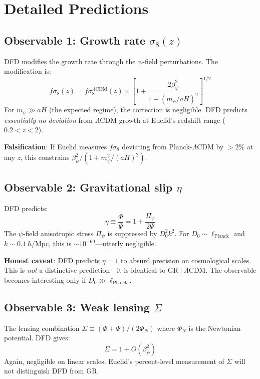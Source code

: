 \documentclass[11pt,a4paper]{article}
\begin{document}
\section{Detailed Predictions}

\subsection{Observable 1: Growth rate $\sigma_8(z)$}

DFD modifies the growth rate through the $\psi$-field perturbations. The modification is:
\begin{equation}
f\sigma_8(z) = f\sigma_8^{\Lambda\text{CDM}}(z) \times \left[1 + \frac{2\beta_\psi^2}{1 + (m_\psi/aH)^2}\right]^{1/2}
\end{equation}
For $m_\psi \gg aH$ (the expected regime), the correction is negligible. DFD predicts \emph{essentially no deviation} from $\Lambda$CDM growth at Euclid's redshift range ($0.2 < z < 2$).

\textbf{Falsification}: If Euclid measures $f\sigma_8$ deviating from Planck-$\Lambda$CDM by $> 2\%$ at any $z$, this constrains $\beta_\psi^2/(1 + m_\psi^2/(aH)^2)$.

\subsection{Observable 2: Gravitational slip $\eta$}

DFD predicts:
\begin{equation}
\eta \equiv \frac{\Phi}{\Psi} = 1 + \frac{\Pi_\psi}{2\Psi}
\end{equation}
The $\psi$-field anisotropic stress $\Pi_\psi$ is suppressed by $D_0^2 k^2$. For $D_0 \sim \ell_{\text{Planck}}$ and $k \sim 0.1~h$/Mpc, this is $\sim 10^{-60}$---utterly negligible.

\textbf{Honest caveat}: DFD predicts $\eta = 1$ to absurd precision on cosmological scales. This is \emph{not} a distinctive prediction---it is identical to GR$+\Lambda$CDM. The observable becomes interesting only if $D_0 \gg \ell_{\text{Planck}}$.

\subsection{Observable 3: Weak lensing $\Sigma$}

The lensing combination $\Sigma \equiv (\Phi + \Psi)/(2\Phi_N)$ where $\Phi_N$ is the Newtonian potential. DFD gives:
\begin{equation}
\Sigma = 1 + O(\beta_\psi^2)
\end{equation}
Again, negligible on linear scales. Euclid's percent-level measurement of $\Sigma$ will not distinguish DFD from GR.
\end{document}
